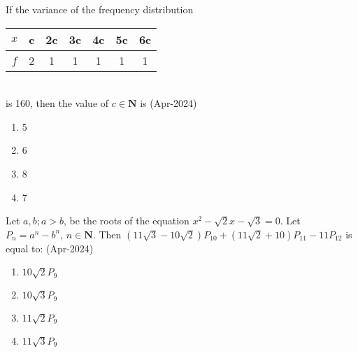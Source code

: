 \item If the variance of the frequency distribution \\
\begin{tabular}{|c|c|c|c|c|c|c|} 
    \hline
        $x$ & c & 2c & 3c & 4c & 5c & 6c \\ 
    \hline
        $f$ & 2 & 1 & 1 & 1 & 1 & 1 \\ 
    \hline
\end{tabular}\\
is 160, then the value of $c\in\mathbf{N}$ is \hfill(Apr-2024)
\begin{enumerate}
    \item 5
    \item 6
    \item 8
    \item 7
\end{enumerate}
\item Let $a, b ;a > b$, be the roots of the equation $x^2 - \sqrt{2}x - \sqrt{3} = 0$. Let $P_n = a^n-b^n$, $n\in\mathbf{N}$. Then $(11\sqrt{3} - 10\sqrt{2})P_{10} + (11\sqrt{2} + 10)P_{11} - 11P_{12}$ is equal to: \hfill(Apr-2024)
\begin{enumerate}
    \item $10\sqrt{2} P_9$
    \item $10\sqrt{3} P_9$
    \item $11\sqrt{2} P_9$
    \item $11\sqrt{3} P_9$
\end{enumerate}

